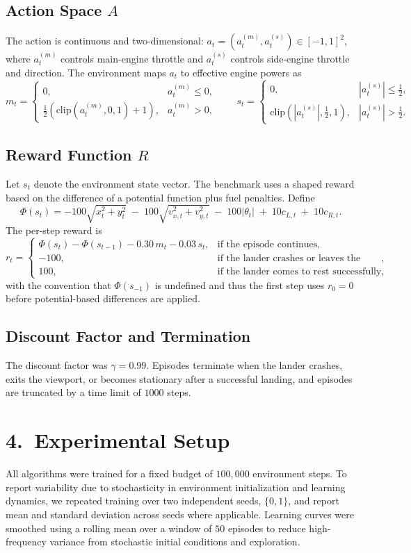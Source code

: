 \documentclass[a4paper,11pt,notitlepage]{report}
\begin{document}
\subsection{Action Space \texorpdfstring{$A$}{A}}
The action is continuous and two-dimensional: $a_t=(a^{(m)}_t,a^{(s)}_t)\in [-1,1]^2$, where $a^{(m)}_t$ controls main-engine throttle and $a^{(s)}_t$ controls side-engine throttle and direction. The environment maps $a_t$ to effective engine powers as
\[
m_t=\begin{cases}
0, & a^{(m)}_t\le 0,\\
\tfrac{1}{2}\left(\mathrm{clip}(a^{(m)}_t,0,1)+1\right), & a^{(m)}_t>0,
\end{cases}
\qquad
s_t=\begin{cases}
0, & |a^{(s)}_t|\le \tfrac{1}{2},\\
\mathrm{clip}(|a^{(s)}_t|,\tfrac{1}{2},1), & |a^{(s)}_t|>\tfrac{1}{2}.
\end{cases}
\]

\subsection{Reward Function \texorpdfstring{$R$}{R}}
Let $s_t$ denote the environment state vector. The benchmark uses a shaped reward based on the difference of a potential function plus fuel penalties. Define
\[
\Phi(s_t)= -100\sqrt{x_t^2+y_t^2}\;-\;100\sqrt{v_{x,t}^2+v_{y,t}^2}\;-\;100|\theta_t|\;+\;10c_{L,t}\;+\;10c_{R,t}.
\]
The per-step reward is
\[
r_t=
\begin{cases}
\Phi(s_t)-\Phi(s_{t-1})-0.30\,m_t-0.03\,s_t, & \text{if the episode continues},\\
-100, & \text{if the lander crashes or leaves the viewport},\\
100, & \text{if the lander comes to rest successfully},
\end{cases}
\]
with the convention that $\Phi(s_{-1})$ is undefined and thus the first step uses $r_0=0$ before potential-based differences are applied.

\subsection{Discount Factor and Termination}
The discount factor was $\gamma=0.99$. Episodes terminate when the lander crashes, exits the viewport, or becomes stationary after a successful landing, and episodes are truncated by a time limit of $1000$ steps.

\section{4.\ Experimental Setup}
All algorithms were trained for a fixed budget of $100{,}000$ environment steps. To report variability due to stochasticity in environment initialization and learning dynamics, we repeated training over two independent seeds, $\{0,1\}$, and report mean and standard deviation across seeds where applicable. Learning curves were smoothed using a rolling mean over a window of $50$ episodes to reduce high-frequency variance from stochastic initial conditions and exploration.
\end{document}
